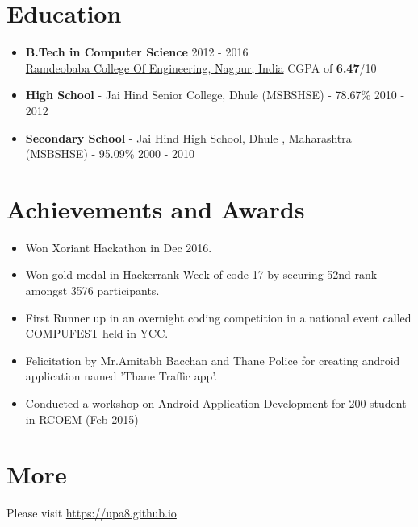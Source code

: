 \documentclass[margin, centered]{res}
\begin{document}
\begin{resume}
\section{Education}
\begin{itemize}[leftmargin=*]\item
\textbf{B.Tech in Computer Science} \hfill 2012 - 2016 \\
\href{http://rknec.edu}{Ramdeobaba College Of Engineering, Nagpur, India}
  CGPA of \textbf{6.47}/10
\item\textbf{High School} - {Jai Hind Senior College, Dhule} (MSBSHSE) - 78.67\% \hfill 2010 - 2012 \
\item\textbf{Secondary School} - Jai Hind High School, Dhule , Maharashtra (MSBSHSE) - 95.09\% \hfill 2000 - 2010
\end{itemize}

\section{Achievements and Awards}
\begin{itemize}[leftmargin=*]
\item Won Xoriant Hackathon in Dec 2016. 
 \item Won gold medal in Hackerrank-Week of code 17 by securing 52nd rank amongst 3576 participants. 
 \item First Runner up in an overnight coding competition in a national event called COMPUFEST held in YCC.
 \item Felicitation by Mr.Amitabh Bacchan and Thane Police for creating android application named 'Thane Traffic 
app'.
\item 
 Conducted a workshop on Android Application Development for 200 student in RCOEM (Feb 2015)
\end{itemize}

\section{More}
Please visit \href{https://upa8.github.io}{https://upa8.github.io}
\end{resume}
\end{document}

